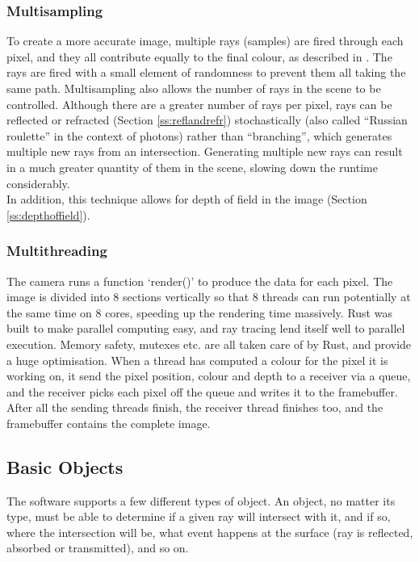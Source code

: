 \documentclass[a4paper]{article}
\begin{document}
\subsubsection{Multisampling} To create a more accurate image, multiple rays (samples) are fired through each pixel, and they all contribute equally to the final colour, as described in \cite{Cook1984multisampling}. The rays are fired with a small element of randomness to prevent them all taking the same path. Multisampling also allows the number of rays in the scene to be controlled. Although there are a greater number of rays per pixel, rays can be reflected or refracted (Section \ref{ss:reflandrefr}) stochastically (also called ``Russian roulette'' in the context of photons) rather than ``branching'', which generates multiple new rays from an intersection. Generating multiple new rays can result in a much greater quantity of them in the scene, slowing down the runtime considerably.\\

In addition, this technique allows for depth of field in the image (Section \ref{ss:depthoffield}).\\

\subsubsection{Multithreading}
The camera runs a function `render()' to produce the data for each pixel. The image is divided into 8 sections vertically so that 8 threads can run potentially at the same time on 8 cores, speeding up the rendering time massively. Rust was built to make parallel computing easy, and ray tracing lend itself well to parallel execution. Memory safety, mutexes etc. are all taken care of by Rust, and provide a huge optimisation. When a thread has computed a colour for the pixel it is working on, it send the pixel position, colour and depth to a receiver via a queue, and the receiver picks each pixel off the queue and writes it to the framebuffer. After all the sending threads finish, the receiver thread finishes too, and the framebuffer contains the complete image.

\subsection{Basic Objects}
The software supports a few different types of object. An object, no matter its type, must be able to determine if a given ray will intersect with it, and if so, where the intersection will be, what event happens at the surface (ray is reflected, absorbed or transmitted), and so on.
\end{document}
